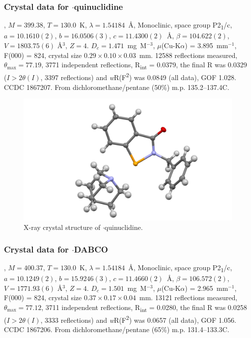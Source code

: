 \begin{refsection}
\subsubsection{Crystal data for \texorpdfstring{$ \cdot $quinuclidine}{C21H24N2OSe}}
, $M=399.38$, $T=130.0$~K, $\lambda=1.54184$~\AA, Monoclinic, space group P2\textsubscript{1}/c, $a = 10.1610(2)$, $b = 16.0506(3)$, $c = 11.4300(2)$~\AA, $\beta = 104.622(2)$\degree, $V = 1803.75(6)$ \AA$^{3}$, $Z = 4$.
$D_{c}= 1.471$~mg~M$^{-3}$, $\mu$(Cu-K$\alpha$) = 3.895~mm$^{-1}$, F(000) = 824, crystal size $0.29 \times 0.10 \times 0.03$~mm.
12588 reflections measured, $\theta_{\max} = 77.19$\degree, 3771 independent reflections, R\textsubscript{int} = 0.0379, the final R was 0.0329 ($I > 2\theta(I)$, 3397 reflections) and \textit{w}R(F\textsuperscript{2}) was 0.0849 (all data), GOF 1.028.
CCDC 1867207.
From dichloromethane/pentane (50\%) m.p. 135.2--137.4\degree{}C.

\begin{figure}
  \includegraphics[width=0.6\linewidth]{Figures/ebs-bn-quin-xtal.pdf}
  \caption{X-ray crystal structure of \texorpdfstring{$ \cdot $quinuclidine}{C21H24N2OSe}.}
\end{figure}

\subsubsection{Crystal data for \texorpdfstring{$ \cdot $DABCO}{C20H23N3OSe}}
, $M=400.37$, $T=130.0$~K, $\lambda=1.54184$~\AA, Monoclinic, space group P2\textsubscript{1}/c, $a = 10.1249(2)$, $b = 15.9246(3)$, $c = 11.4660(2)$~\AA, $\beta = 106.572(2)$\degree, $V = 1771.93(6)$ \AA$^{3}$, $Z = 4$.
$D_{c} = 1.501$~mg~M$^{-3}$, $\mu$(Cu-K$\alpha$) = 2.965~mm$^{-1}$, F(000) = 824, crystal size $0.37 \times 0.17 \times 0.04$~mm.
13121 reflections measured, $\theta_{\max} = 77.12$\degree, 3711 independent reflections, R\textsubscript{int} = 0.0280, the final R was 0.0258 ($I > 2\theta(I)$, 3333 reflections) and \textit{w}R(F\textsuperscript{2}) was 0.0657 (all data), GOF 1.056.
CCDC 1867206.
From dichloromethane/pentane (65\%) m.p. 131.4--133.3\degree{}C.


\end{refsection}
